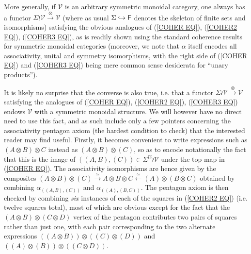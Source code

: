 \documentclass[a4paper,10pt]{article}%
\begin{document}
\begin{remark}
\label{SIGMA_WR_REM}
More generally, if $\mathcal{V}$ is an arbitrary
symmetric monoidal category, one always has a functor 
$\Sigma \wr \mathcal{V} \xrightarrow{\otimes} \mathcal{V}$
(where as usual $\Sigma \hookrightarrow \mathsf{F}$ denotes the skeleton of finite sets and isomorphisms) satisfying the obvious analogues of
(\ref{COHER EQ}), (\ref{COHER2 EQ}), (\ref{COHER3 EQ}),
as is readily shown using the standard coherence results for symmetric monoidal categories 
(moreover, we note that $\alpha$ itself encodes all associativity, unital and symmetry isomorphisms, with the 
right side of (\ref{COHER EQ}) and (\ref{COHER3 EQ})
being mere common sense desiderata for ``unary products'').

It is likely no surprise that the converse is also true, i.e. 
that a functor 
$\Sigma \wr \mathcal{V} \xrightarrow{\otimes} \mathcal{V}$
satisfying the analogues of 
(\ref{COHER EQ}), (\ref{COHER2 EQ}), (\ref{COHER3 EQ})
endows $\mathcal{V}$ with a symmetric monoidal structure.
We will however have no direct need to use this fact, and as such include only a few pointers concerning the associativity pentagon axiom (the hardest condition to check) that the interested reader may find useful. 
Firstly, it becomes convenient to write expressions such as
$(A \otimes B) \otimes C$ instead as 
$(A \otimes B) \otimes (C)$, so as to encode notationally the fact that this is the image of 
$((A,B),(C)) \in \Sigma^{\wr 2} \wr \mathcal{V}$ under the top map in (\ref{COHER EQ}). The associativity isomorphisms are hence given by the composites
$
(A \otimes B) \otimes (C) \xrightarrow{\simeq} 
A \otimes B \otimes C \xleftarrow{\simeq}
(A) \otimes (B \otimes C)
$
obtained by combining 
$\alpha_{((A,B),(C))}$ 
and
$\alpha_{((A),(B,C))}$.
The pentagon axiom is then checked by combining \textit{six} instances of each of the squares in (\ref{COHER2 EQ}) (i.e. twelve squares total), most of which are obvious except for the fact that the $(A\otimes B) \otimes (C \otimes D)$ vertex of the pentagon contributes two pairs of squares rather than just one, with each pair corresponding to the two alternate expressions 
$((A \otimes B)) \otimes ((C) \otimes (D))$ and 
$((A) \otimes (B)) \otimes ((C \otimes D))$.
\end{remark}

\end{document}
